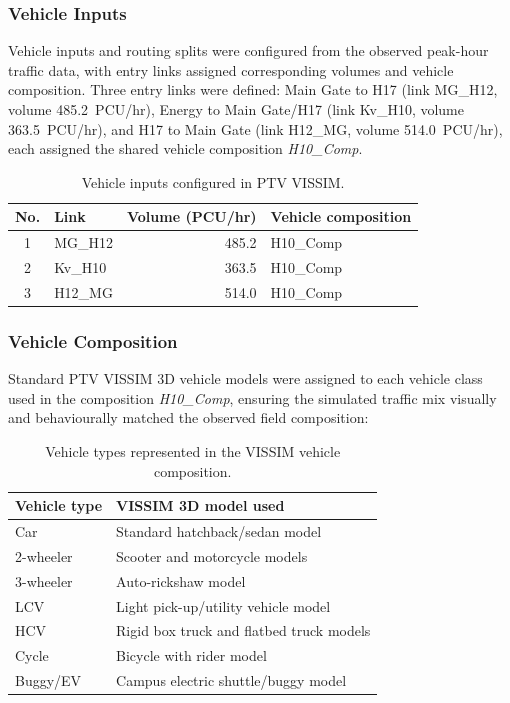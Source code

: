 \documentclass[11pt]{article}
\begin{document}
\subsubsection{Vehicle Inputs}
Vehicle inputs and routing splits were configured from the observed peak-hour traffic data, with entry
links assigned corresponding volumes and vehicle composition. Three entry links were defined: Main Gate
to H17 (link MG\_H12, volume 485.2~PCU/hr), Energy to Main Gate/H17 (link Kv\_H10, volume 363.5~PCU/hr),
and H17 to Main Gate (link H12\_MG, volume 514.0~PCU/hr), each assigned the shared vehicle composition
\textit{H10\_Comp}.

\begin{table}[H]
  \centering
  \small
  \caption{Vehicle inputs configured in PTV VISSIM.}
  \begin{tabular}{@{}clrl@{}}
    \toprule
    \textbf{No.} & \textbf{Link} & \textbf{Volume (PCU/hr)} & \textbf{Vehicle composition} \\
    \midrule
    1 & MG\_H12 & 485.2 & H10\_Comp \\
    2 & Kv\_H10 & 363.5 & H10\_Comp \\
    3 & H12\_MG & 514.0 & H10\_Comp \\
    \bottomrule
  \end{tabular}
\end{table}

\subsubsection{Vehicle Composition}
Standard PTV VISSIM 3D vehicle models were assigned to each vehicle class used in the composition
\textit{H10\_Comp}, ensuring the simulated traffic mix visually and behaviourally matched the observed
field composition:

\begin{table}[H]
  \centering
  \small
  \caption{Vehicle types represented in the VISSIM vehicle composition.}
  \begin{tabular}{@{}ll@{}}
    \toprule
    \textbf{Vehicle type} & \textbf{VISSIM 3D model used} \\
    \midrule
    Car        & Standard hatchback/sedan model \\
    2-wheeler  & Scooter and motorcycle models \\
    3-wheeler  & Auto-rickshaw model \\
    LCV        & Light pick-up/utility vehicle model \\
    HCV        & Rigid box truck and flatbed truck models \\
    Cycle      & Bicycle with rider model \\
    Buggy/EV   & Campus electric shuttle/buggy model \\
    \bottomrule
  \end{tabular}
\end{table}
\end{document}
